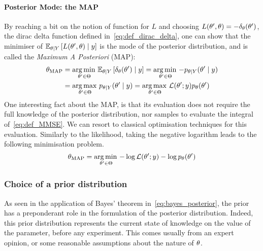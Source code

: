 \documentclass[../../Main_ManuscritThese.tex]{subfiles}
\begin{document}
\paragraph{Posterior Mode: the MAP}
By reaching a bit on the notion of function for $L$ and choosing
$L(\theta^{\prime},\theta) = -\delta_{\theta}(\theta^{\prime})$, the dirac delta
function defined in~\cref{eq:def_dirac_delta}, one can show that the
minimiser of $\mathbb{E}_{\theta\mid Y}\left[L(\theta^{\prime},\theta) \mid y\right]$
is the mode of the posterior distribution, and is called the
\emph{Maximum A Posteriori} (MAP):
\begin{align}
  \label{eq:def_MAP}
  {\theta}_{\mathrm{MAP}} &= \operatorname*{arg\,min \,}_{\theta^{\prime} \in \Theta}\mathbb{E}_{\theta\mid Y}\left[\delta_{\theta}(\theta^{\prime})\mid y\right] = \operatorname*{arg\,min \,}_{\theta^{\prime} \in \Theta} -p_{\theta\mid Y}(\theta^{\prime}\mid y) \\
                         &= \operatorname*{arg\,max \,}_{\theta^{\prime} \in \Theta} p_{\theta\mid Y}(\theta^{\prime} \mid y) = \operatorname*{arg\,max \,}_{\theta^{\prime} \in \Theta} \mathcal{L}(\theta^{\prime} ;y)p_{\theta}(\theta^{\prime})
                           \nonumber
\end{align}
One interesting fact about the MAP, is that its evaluation does not require the full knowledge of the posterior distribution, nor samples to evaluate the integral of~\cref{eq:def_MMSE}. We can resort to classical optimisation techniques for this evaluation. Similarly to the likelihood, taking the negative logarithm leads to the following minimisation problem.
\begin{equation}
  \label{eq:minimisation_MAP_log}
  {\theta}_{\mathrm{MAP}} = \operatorname*{arg\,min \,}_{\theta^{\prime}\in \Theta} -\log \mathcal{L}(\theta^{\prime};y) - \log p_{\theta}(\theta^{\prime})
\end{equation}

\subsubsection{Choice of a prior distribution}
\label{sec:choice_prior}
As seen in the application of Bayes' theorem
in~\cref{eq:bayes_posterior}, the prior has a preponderant role in the
formulation of the posterior distribution. Indeed, this prior
distribution represents the current state of knowledge on the value of
the parameter, before any experiment. This comes usually from an
expert opinion, or some reasonable assumptions about the nature of
$\theta$.
\end{document}
